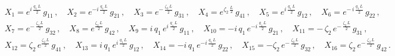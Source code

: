 \documentclass[aps,prb,onecolumn,longbibliography,nofootinbib,citeautoscript,10pt]{revtex4-2}
\def \nn{\nonumber \\}
\def\nn{\nonumber \\}
\def \nn{\nonumber \\}
\begin{document}
\begin{align}
& X_1  = e^{ i \, \frac{ q_1 \, L} {2}} \, g_{11}   \,, \quad
 X_2  = e^{- i \, \frac{ q_1 \, L} {2}} \, g_{21} \,,  \quad 
 X_3  = e^{- \,  \frac{\zeta_2  \, L} {2}} \, g_{31}   \,,  \quad
 X_4  = e^{\zeta_2  \,  \frac{L} {2}} \, g_{41} \,, \quad
X_5  = e^{ i \, \frac{ q_1 \, L} {2}} \, g_{12}   \,,  \quad
X_6  = e^{- \, i \, \frac{ q_1 \, L} {2}} \, g_{22}   \,,  
\nn & X_7  = e^{-\, \frac{\zeta_2  \,L} {2}} \, g_{32}   \,,  \quad
X_8  = e^{ \frac{\zeta_2  \, L} {2}} \, g_{42} \,, 
\quad X_9  =  i \, q_1 \, e^{ i \, \frac{ q_1 \, L} {2}} \, g_{11}   \,,  
\quad X_{10}  = - i \, q_1 \, e^{- i \, \frac{ q_1 \, L} {2}} \, g_{21}   \,,  
\quad X_{11}  = - \, \zeta_2 \, e^{- \,  \frac{\zeta_2  \, L} {2}} \, g_{31}   \,, 
\nn & X_{12}  = \zeta_2 \, e^{\frac{\zeta_2  \, L} {2}} \, g_{41} \,, 
\quad X_{13}  =  i \, q_1 \, e^{ i \, \frac{ q_1 \, L} {2}} \, g_{12}   \,,  
\quad X_{14}  = - i \, q_1 \, e^{- i \, \frac{ q_1 \, L} {2}} \, g_{22}   \,,  
\quad X_{15}  = -\zeta_2 \, e^{-  \, \frac{\zeta_2 \,L} {2}} \, g_{32}   \,, 
\quad X_{16}  = \zeta_2 \, e^{- \,  \frac{\zeta_2 \,L} {2}} \, g_{42}\,.
\end{align}
\end{document}
